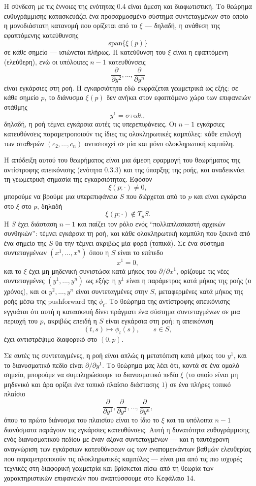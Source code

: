\documentclass[11pt,a4paper,twoside,openright]{book}
\begin{document}
Η σύνδεση με τις έννοιες της ενότητας 0.4 είναι άμεση και διαφωτιστική. Το θεώρημα ευθυγράμμισης κατασκευάζει ένα προσαρμοσμένο σύστημα συντεταγμένων στο οποίο η μονοδιάστατη κατανομή που ορίζεται από το $\xi$ --- δηλαδή, η ανάθεση της εφαπτόμενης κατεύθυνσης
\[
\text{span}\{\xi(p)\}
\]
σε κάθε σημείο --- ισιώνεται πλήρως. Η κατεύθυνση του $\xi$ είναι η εφαπτόμενη (ελεύθερη), ενώ οι υπόλοιπες $n-1$ κατευθύνσεις
\[
\frac{\partial}{\partial y^2}, \dots, \frac{\partial}{\partial y^n}
\]
είναι εγκάρσιες στη ροή. Η εγκαρσιότητα εδώ εκφράζεται γεωμετρικά ως εξής: σε κάθε σημείο $p$, το διάνυσμα $\xi(p)$ δεν ανήκει στον εφαπτόμενο χώρο των επιφανειών στάθμης
\[
y^1 = \text{σταθ.},
\]
δηλαδή, η ροή τέμνει εγκάρσια αυτές τις υπερεπιφάνειες. Οι $n-1$ εγκάρσιες κατευθύνσεις παραμετροποιούν τις ίδιες τις ολοκληρωτικές καμπύλες: κάθε επιλογή των σταθερών $(c_2, \dots, c_n)$ αντιστοιχεί σε μία και μόνο ολοκληρωτική καμπύλη.

Η απόδειξη αυτού του θεωρήματος είναι μια άμεση εφαρμογή του θεωρήματος της αντίστροφης απεικόνισης (ενότητα 0.3.3) και της ύπαρξης της ροής, και αναδεικνύει τη γεωμετρική σημασία της εγκαρσιότητας. Εφόσον
\[
\xi(p; \cdot) \neq 0,
\]
μπορούμε να βρούμε μια υπερεπιφάνεια $S$ που διέρχεται από το $p$ και είναι εγκάρσια στο $\xi$ στο $p$, δηλαδή
\[
\xi(p; \cdot) \notin T_pS.
\]
Η $S$ έχει διάσταση $n-1$ και παίζει τον ρόλο ενός ``πολλαπλασιαστή αρχικών συνθηκών'': τέμνει εγκάρσια τη ροή, και κάθε ολοκληρωτική καμπύλη που ξεκινά από ένα σημείο της $S$ θα την τέμνει ακριβώς μία φορά (τοπικά). Σε ένα σύστημα συντεταγμένων $(x^1, \dots, x^n)$ όπου η $S$ είναι το επίπεδο
\[
x^1 = 0,
\]
και το $\xi$ έχει μη μηδενική συνιστώσα κατά μήκος του $\partial / \partial x^1$, ορίζουμε τις νέες συντεταγμένες $(y^1, \dots, y^n)$ ως εξής: η $y^1$ είναι η παράμετρος κατά μήκος της ροής (ο χρόνος), και οι $y^2, \dots, y^n$ είναι συντεταγμένες στην $S$, μεταφερμένες κατά μήκος της ροής μέσω της pushforward της $\phi_t$. Το θεώρημα της αντίστροφης απεικόνισης εγγυάται ότι αυτή η κατασκευή δίνει πράγματι ένα σύστημα συντεταγμένων σε μια περιοχή του $p$, ακριβώς επειδή η $S$ είναι εγκάρσια στη ροή: η απεικόνιση
\[
(t, s) \mapsto \phi_t(s), \qquad s \in S,
\]
έχει αντιστρέψιμο διαφορικό στο $(0, p)$.

Σε αυτές τις συντεταγμένες, η ροή είναι απλώς η μετατόπιση κατά μήκος του $y^1$, και το διανυσματικό πεδίο είναι $\partial / \partial y^1$. Το θεώρημα μας λέει ότι, κοντά σε ένα ομαλό σημείο, μπορούμε να συμπληρώσουμε το διανυσματικό πεδίο $\xi$ (το οποίο είναι μη μηδενικό και άρα ορίζει ένα τοπικό πλαίσιο διάστασης $1$) σε ένα πλήρες τοπικό πλαίσιο
\[
\frac{\partial}{\partial y^1}, \frac{\partial}{\partial y^2}, \dots, \frac{\partial}{\partial y^n},
\]
όπου το πρώτο διάνυσμα του πλαισίου είναι το ίδιο το $\xi$ και τα υπόλοιπα $n-1$ διανύσματα παράγουν τις εγκάρσιες κατευθύνσεις. Αυτή η δυνατότητα ευθυγράμμισης ενός διανυσματικού πεδίου με έναν άξονα συντεταγμένων --- και η ταυτόχρονη αναγνώριση των εγκάρσιων κατευθύνσεων ως των εναπομεινάντων βαθμών ελευθερίας που παραμετροποιούν τις ολοκληρωτικές καμπύλες --- είναι μια από τις πιο ισχυρές τεχνικές στη διαφορική γεωμετρία και βρίσκεται πίσω από τη θεωρία των χαρακτηριστικών επιφανειών που αναπτύσσουμε στο Κεφάλαιο 14.
\end{document}
